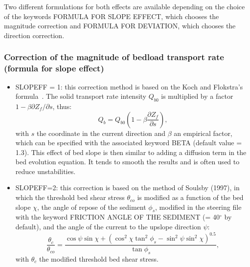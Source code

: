Two different formulations for both effects are available depending on the
choice of the keywords {\ttfamily FORMULA FOR SLOPE EFFECT}, which chooses the magnitude correction and {\ttfamily FORMULA FOR DEVIATION}, which chooses the direction correction.

\subsubsection{Correction of the magnitude of bedload transport rate (formula for slope effect)}
\begin{itemize}
\item {\ttfamily SLOPEFF = 1}: this correction method is based on
the Koch and Flokstra's formula~\cite{Koch}. The solid transport rate
intensity $Q_{b0}$ is multiplied by a factor $1-\beta\partial Z_f/\partial s$, thus: 
\begin{equation}\label{eq:SLOPEFF1}
Q_b = Q_{b0}\left(1-\beta\frac{\partial Z_f}{\partial s}\right), 
\end{equation}
with $s$ the coordinate in the current direction and $\beta$ an empirical factor, which can be specified with the associated keyword {\ttfamily BETA} (default value {\ttfamily = 1.3}). This effect of bed slope is then similar
to adding a diffusion term in the bed evolution equation. It tends to smooth the results and is often used to reduce unstabilities.

\item {\ttfamily SLOPEFF=2}: this correction is based on the method of Soulsby (1997), in which the threshold bed
shear stress $\theta_{co}$ is modified as a function of the bed slope $\chi$, the angle of repose of the sediment $\phi_s$, modified in the \sisyphe steering file with the keyword {\ttfamily FRICTION ANGLE OF THE SEDIMENT} ({\ttfamily = 40}$^\circ$ by default), and the angle of the current to the upslope direction $\psi$: 
\begin{equation}\label{eq:SLOPEFF2}
\frac{\theta_c}{\theta_{co}} = \frac{\cos\psi \sin\chi + 
( \cos^2\chi \tan^2\phi_s - \sin^2\psi \sin^2\chi)^{0.5}}{\tan
\phi_s},
\end{equation}
with $\theta_c$ the modified threshold bed shear stress.


\end{itemize}
